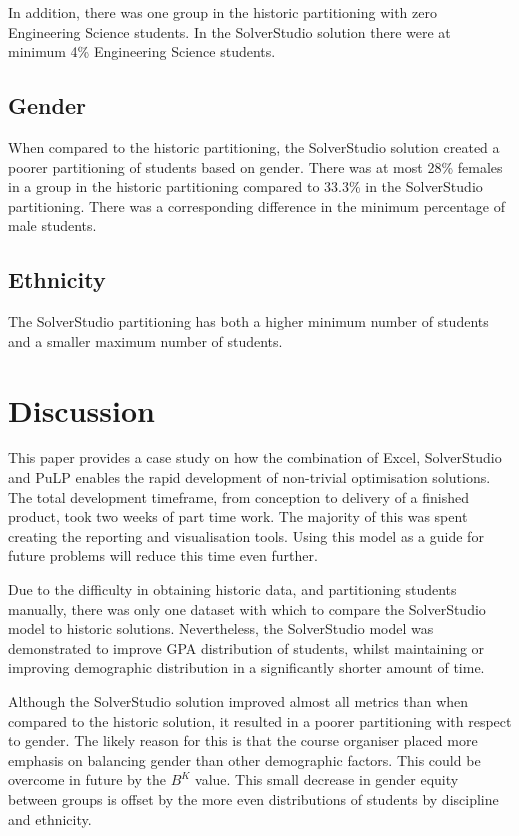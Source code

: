 \documentclass[12pt]{ORSNZ}
\begin{document}
In addition, there was one group in the historic partitioning with zero Engineering Science students. In the SolverStudio solution there were at minimum 4\% Engineering Science students.

\subsection{Gender}
When compared to the historic partitioning, the SolverStudio solution created a poorer partitioning of students based on gender. There was at most 28\% females in a group in the historic partitioning compared to 33.3\% in the SolverStudio partitioning. There was a corresponding difference in the minimum percentage of male students.

\subsection{Ethnicity}

The SolverStudio partitioning has both a higher minimum number of students and a smaller maximum number of students.

\section{Discussion}
This paper provides a case study on how the combination of Excel, SolverStudio and PuLP enables the rapid development of non-trivial optimisation solutions. The total development timeframe, from conception to delivery of a finished product, took two weeks of part time work. The majority of this was spent creating the reporting and visualisation tools. Using this model as a guide for future problems will reduce this time even further.

Due to the difficulty in obtaining historic data, and partitioning students manually, there was only one dataset with which to compare the SolverStudio model to historic solutions. Nevertheless, the SolverStudio model was demonstrated to improve GPA distribution of students, whilst maintaining or improving demographic distribution in a significantly shorter amount of time.

Although the SolverStudio solution improved almost all metrics than when compared to the historic solution, it resulted in a poorer partitioning with respect to gender. The likely reason for this is that the course organiser placed more emphasis on balancing gender than other demographic factors. This could be overcome in future by the $B^K$ value. This small decrease in gender equity between groups is offset by the more even distributions of students by discipline and ethnicity.
\end{document}
